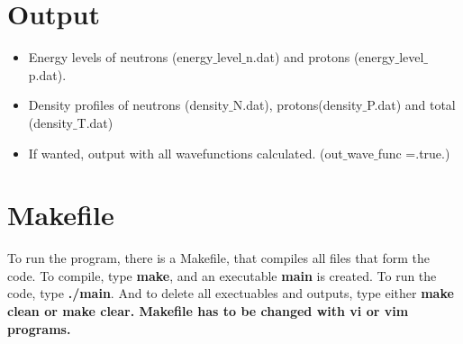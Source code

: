 \documentclass[a4paper,10pt]{article}
\begin{document}
\section{Output}
\begin{itemize}
 \item Energy levels of neutrons (energy$\_$level$\_$n.dat) and protons (energy$\_$level$\_$p.dat).
 \item Density profiles of neutrons (density$\_$N.dat), protons(density$\_$P.dat) and total (density$\_$T.dat)
 \item If wanted, output with all wavefunctions calculated. (out$\_$wave$\_$func =.true.)
\end{itemize}



\section{Makefile}
To run the program, there is a Makefile, that compiles all files that form the code. 
To compile, type \textbf{make}, and an executable \textbf{main} is created. To run the code, 
type \textbf{./main}. And to delete all exectuables and outputs, type either \bf{make clean} or
\textbf{make clear}. Makefile has to be changed with vi or vim programs.
\end{document}
